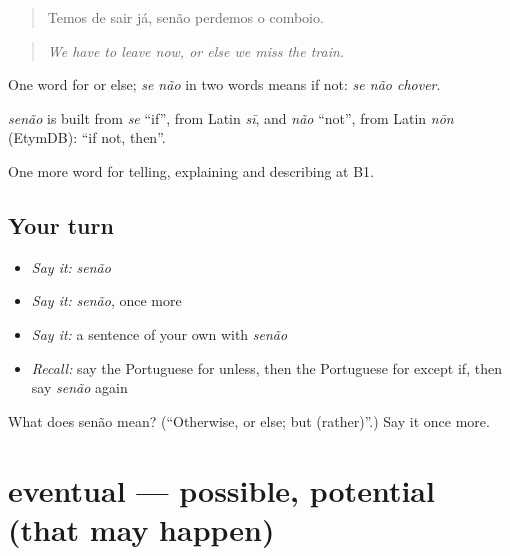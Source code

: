\begin{quote}
Temos de sair já, senão perdemos o comboio.
\end{quote}

\begin{quote}
\emph{We have to leave now, or else we miss the train.}
\end{quote}

One word for or else; \emph{se não} in two words means if not: \emph{se não chover}.

\begin{cousinweb}
\emph{senão} is built from \emph{se} \textquotedblleft{}if\textquotedblright{}, from Latin \emph{sī}, and \emph{não} \textquotedblleft{}not\textquotedblright{}, from Latin \emph{nōn} (EtymDB): \textquotedblleft{}if not, then\textquotedblright{}.
\end{cousinweb}

\begin{grammarlens}[title={What you've built}]
One more word for telling, explaining and describing at B1.
\end{grammarlens}

\subsection*{Your turn}
\begin{itemize}
\raggedright
  \item \emph{Say it:} \emph{senão}
  \item \emph{Say it:} \emph{senão}, once more
  \item \emph{Say it:} a sentence of your own with \emph{senão}
  \item \emph{Recall:} say the Portuguese for unless, then the Portuguese for except if, then say \emph{senão} again
\end{itemize}

\begin{tcolorbox}[breakable,colback=teal!4,colframe=teal!35!black,title={Before you move on}]
What does senão mean? (\textquotedblleft{}Otherwise, or else; but (rather)\textquotedblright{}.) Say it once more.
\end{tcolorbox}
\section[eventual]{eventual — possible, potential (that may happen)}

\label{lesson:PT-C370-eventual}



